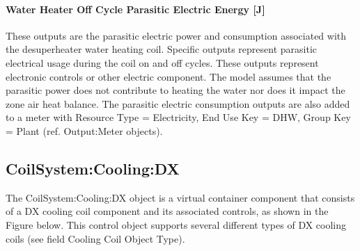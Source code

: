 \paragraph{Water Heater Off Cycle Parasitic Electric Energy {[}J{]}}\label{water-heater-off-cycle-parasitic-electric-energy-j}

These outputs are the parasitic electric power and consumption associated with the desuperheater water heating coil. Specific outputs represent parasitic electrical usage during the coil on and off cycles. These outputs represent electronic controls or other electric component. The model assumes that the parasitic power does not contribute to heating the water nor does it impact the zone air heat balance. The parasitic electric consumption outputs are also added to a meter with Resource Type = Electricity, End Use Key = DHW, Group Key = Plant (ref. Output:Meter objects).

\subsection{CoilSystem:Cooling:DX}\label{coilsystemcoolingdx}

The CoilSystem:Cooling:DX object is a virtual container component that consists of a DX cooling coil component and its associated controls, as shown in the Figure below. This control object supports several different types of DX cooling coils (see field Cooling Coil Object Type).


